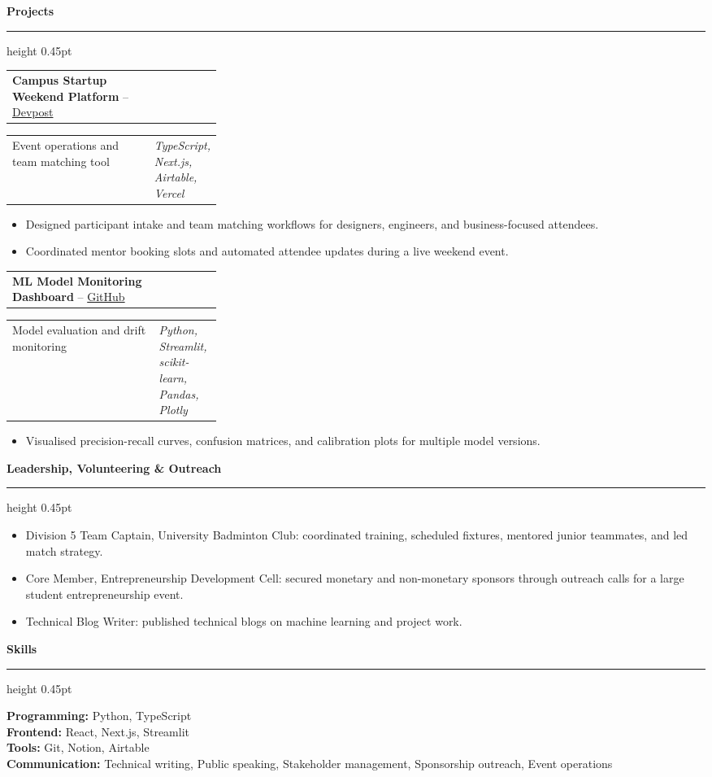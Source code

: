 \documentclass[10pt,a4paper]{article}
\makeatletter
\newcommand{\cvsection}[1]{%
  \vspace{6pt}%
  {\large\bfseries\color{AccentBlue} #1}\\[-2pt]%
  {\color{AccentBlue}\hrule height 0.45pt}%
  \vspace{3pt}%
}
\newcommand{\cvrow}[2]{%
  \begin{tabularx}{\linewidth}{@{}X>{\raggedleft\arraybackslash}p{0.30\linewidth}@{}}
    #1 & #2
  \end{tabularx}
}
\newcommand{\cventryspace}{\vspace{2pt}}
\makeatother
\begin{document}
\cvsection{ Projects }
\cvrow{\textbf{ Campus Startup Weekend Platform } -- \href{\detokenize{https://devpost.com/software/example-campus-startup-weekend}}{Devpost}}{ 2025 }
\cvrow{ Event operations and team matching tool }{ \textit{ TypeScript, Next.js, Airtable, Vercel } }
\begin{itemize}
  \item Designed participant intake and team matching workflows for designers, engineers, and business-focused attendees.
  \item Coordinated mentor booking slots and automated attendee updates during a live weekend event.
\end{itemize}
\cventryspace
\cvrow{\textbf{ ML Model Monitoring Dashboard } -- \href{\detokenize{https://github.com/example/ml-monitoring-dashboard}}{GitHub}}{ 2026 }
\cvrow{ Model evaluation and drift monitoring }{ \textit{ Python, Streamlit, scikit-learn, Pandas, Plotly } }
\begin{itemize}
  \item Visualised precision-recall curves, confusion matrices, and calibration plots for multiple model versions.
\end{itemize}
\cventryspace

\cvsection{ Leadership, Volunteering \& Outreach }
\begin{itemize}
  \item Division 5 Team Captain, University Badminton Club: coordinated training, scheduled fixtures, mentored junior teammates, and led match strategy.
  \item Core Member, Entrepreneurship Development Cell: secured monetary and non-monetary sponsors through outreach calls for a large student entrepreneurship event.
  \item Technical Blog Writer: published technical blogs on machine learning and project work.
\end{itemize}

\cvsection{ Skills }
\textbf{ Programming:} Python, TypeScript\\[1pt]\textbf{ Frontend:} React, Next.js, Streamlit\\[1pt]\textbf{ Tools:} Git, Notion, Airtable\\[1pt]\textbf{ Communication:} Technical writing, Public speaking, Stakeholder management, Sponsorship outreach, Event operations
\end{document}
